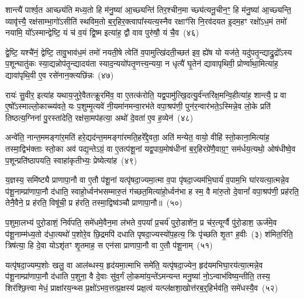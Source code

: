 शान्त्यै॑ पार्श्व॒त आच्छ्य॑ति मध्य॒तो हि म॑नु॒ष्या॑ आ॒च्छ्यन्ति॑ तिर॒श्चीन॒मा च्छ्य॑त्यनू॒चीन॒ꣳ॒ हि म॑नु॒ष्या॑ आ॒च्छ्यन्ति॒ व्यावृ॑त्त्यै॒ रक्ष॑साम्भा॒गो॑\-ऽसीति॑ स्थविम॒तो ब॒र्॒\mbox{}हिर॒क्त्वापा᳚स्यत्य॒स्नैव रक्षाꣳ॑सि नि॒रव॑दयत इ॒दम॒हꣳ रक्षो॑\-ऽध॒मं तमो॑ नयामि॒ यो᳚\-ऽस्मान्द्वेष्टि॒ यं च॑ व॒यं द्वि॒ष्म इत्या॑ह॒ द्वौ वाव पुरु॑षौ॒ यं चै॒व~(४६)

द्वे॒ष्टि॒ यश्चै॑नं॒ द्वेष्टि॒ तावु॒भाव॑ध॒मं तमो॑ नयती॒षे त्वेति॑ व॒पामुत्खि॑दती॒च्छत॑ इव॒ ह्ये॑ष यो यज॑ते॒ यदु॑पतृ॒न्द्याद्रु॒द्रो᳚\-ऽस्य प॒शून्घातु॑कः स्या॒द्यन्नोप॑तृ॒न्द्यादय॑ता स्याद॒न्ययो॑पतृ॒णत्त्य॒न्यया॒ न धृत्यै॑ घृ॒तेन॑ द्यावा\-पृथिवी॒ प्रोर्ण्वा॑था॒मित्या॑ह॒ द्यावा॑पृथि॒वी ए॒व रसे॑नान॒क्त्यछि॑न्नः~(४७)

रायः॑ सु॒वीर॒ इत्या॑ह यथाय॒जुरे॒वैतत्क्रू॒रमि॑व॒ वा ए॒तत्क॑रोति॒ यद्व॒पामु॑त्खि॒दत्यु॒र्व॑न्तरि॑क्ष॒मन्वि॒हीत्या॑ह॒ शान्त्यै॒ प्र वा ए॒षो᳚\-ऽस्माल्लो॒काच्च्य॑वते॒ यः प॒शुम्मृ॒त्यवे॑ नी॒यमा॑नमन्वा॒रभ॑ते वपा॒श्रप॑णी॒ पुन॑र॒न्वार॑भते॒\-ऽस्मिन्ने॒व लो॒के प्रति॑ तिष्ठत्य॒ग्निना॑ पु॒रस्ता॑देति॒ रक्ष॑सा॒मप॑हत्या॒ अथो॑ दे॒वता॑ ए॒व ह॒व्येन॑~(४८)

अन्वे॑ति॒ नान्त॒ममङ्गा॑र॒मति॑ हरे॒द्यद॑न्त॒ममङ्गा॑रमति॒हरे᳚द्दे॒वता॒ अति॑ मन्येत॒ वायो॒ वीहि॑ स्तो॒काना॒मित्या॑ह॒ तस्मा॒द्विभ॑क्ताः स्तो॒का अव॑ पद्य॒न्ते\-ऽग्रं॒ वा ए॒तत्प॑शू॒नां यद्व॒पाग्र॒मोष॑धीनां ब॒र्॒\mbox{}हिरग्रे॑णै॒वाग्र॒ꣳ॒ सम॑र्धय॒त्यथो॒ ओष॑धीष्वे॒व प॒शून्प्रति॑\-ष्ठापयति॒ स्वाहा॑कृतीभ्यः॒ प्रेष्येत्या॑ह~(४९)

य॒ज्ञस्य॒ समि॑ष्ट्यै प्राणापा॒नौ वा ए॒तौ प॑शू॒नां यत्पृ॑षदा॒ज्यमा॒त्मा व॒पा पृ॑षदा॒ज्यम॑भि॒घार्य॑ व॒पाम॒भि घा॑रयत्या॒त्मन्ने॒व प॑शू॒नाम्प्रा॑णापा॒नौ द॑धाति॒ स्वाहो॒र्ध्वन॑भसम्मारु॒तं ग॑च्छत॒मित्या॑हो॒र्ध्वन॑भा ह स्म॒ वै मा॑रु॒तो दे॒वानां᳚ वपा॒श्रप॑णी॒ प्रह॑रति॒ तेनै॒वैने॒ प्र ह॑रति॒ विषू॑ची॒ प्र ह॑रति॒ तस्मा॒द्विष्व॑ञ्चौ प्राणापा॒नौ॥~(५०)

{\anuvakamend[{स्वधि॑तिश्चै॒वाच्छि॑न्नो ह॒व्येने॒ष्येत्या॑ह॒ षट्च॑त्वारिꣳशच्च}]}%

प॒शुमा॒लभ्य॑ पुरो॒डाशं॒ निर्व॑पति॒ समे॑धमे॒वैन॒मा ल॑भते व॒पया᳚ प्र॒चर्य॑ पुरो॒डाशे॑न॒ प्र च॑र॒त्यूर्ग्वै पु॑रो॒डाश॒ ऊर्ज॑मे॒व प॑शू॒नाम्म॑ध्य॒तो द॑धा॒त्यथो॑ प॒शोरे॒व छि॒द्रमपि॑ दधाति पृषदा॒ज्यस्यो॑प॒हत्य॒ त्रिः पृ॑च्छति शृ॒तꣳ ह॒वीः~(३) श॑मित॒रिति॒ त्रिष॑त्या॒ हि दे॒वा यो\-ऽशृ॑तꣳ शृ॒तमाह॒ स एन॑सा प्राणापा॒नौ वा ए॒तौ प॑शू॒नाम्~(५१)

यत्पृ॑षदा॒ज्यम्प॒शोः खलु॒ वा आल॑ब्धस्य॒ हृद॑यमा॒त्माभि समे॑ति॒ यत्पृ॑षदा॒ज्येन॒ हृद॑यमभिघा॒रय॑त्या॒त्मन्ने॒व प॑शू॒नाम्प्रा॑णापा॒नौ द॑धाति प॒शुना॒ वै दे॒वाः सु॑व॒र्गं लो॒कमा॑य॒न्ते॑\-ऽमन्यन्त मनु॒ष्या॑ नो॒\-ऽन्वाभ॑विष्य॒न्तीति॒ तस्य॒ शिर॑श्छि॒त्त्वा मेधं॒ प्राक्षा॑रय॒न्थ्स प्र॒क्षो॑\-ऽभव॒त्तत्प्र॒क्षस्य॑ प्रक्ष॒त्वं यत्प्ल॑क्षशा॒खोत्त॑रब॒र्॒\mbox{}हिर्भव॑ति॒ समे॑धस्यै॒व~(५२)

